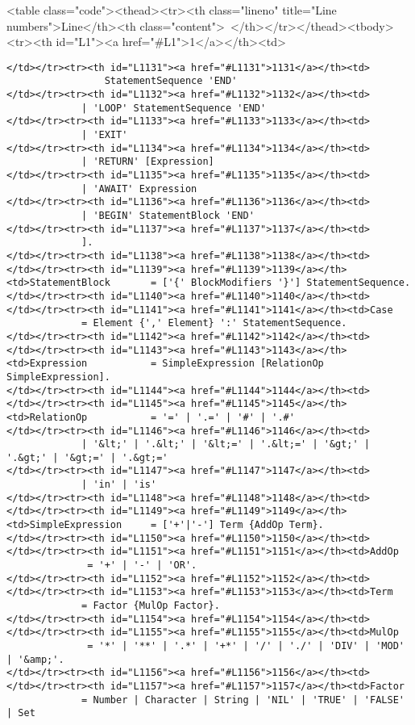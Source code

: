 <table class="code"><thead><tr><th class="lineno" title="Line numbers">Line</th><th class="content"> </th></tr></thead><tbody><tr><th id="L1"><a href="#L1">1</a></th><td>\documentclass[a4paper,11pt]{article}
\begin{document}
\begin{lstlisting}[language = EBNF, frame=none,xleftmargin=0mm]
</td></tr><tr><th id="L1131"><a href="#L1131">1131</a></th><td>                         StatementSequence 'END'
</td></tr><tr><th id="L1132"><a href="#L1132">1132</a></th><td>                     | 'LOOP' StatementSequence 'END'
</td></tr><tr><th id="L1133"><a href="#L1133">1133</a></th><td>                     | 'EXIT'
</td></tr><tr><th id="L1134"><a href="#L1134">1134</a></th><td>                     | 'RETURN' [Expression]
</td></tr><tr><th id="L1135"><a href="#L1135">1135</a></th><td>                     | 'AWAIT' Expression
</td></tr><tr><th id="L1136"><a href="#L1136">1136</a></th><td>                     | 'BEGIN' StatementBlock 'END'
</td></tr><tr><th id="L1137"><a href="#L1137">1137</a></th><td>                     ].
</td></tr><tr><th id="L1138"><a href="#L1138">1138</a></th><td>
</td></tr><tr><th id="L1139"><a href="#L1139">1139</a></th><td>StatementBlock       = ['{' BlockModifiers '}'] StatementSequence.
</td></tr><tr><th id="L1140"><a href="#L1140">1140</a></th><td>
</td></tr><tr><th id="L1141"><a href="#L1141">1141</a></th><td>Case                 = Element {',' Element} ':' StatementSequence.
</td></tr><tr><th id="L1142"><a href="#L1142">1142</a></th><td>
</td></tr><tr><th id="L1143"><a href="#L1143">1143</a></th><td>Expression           = SimpleExpression [RelationOp SimpleExpression].
</td></tr><tr><th id="L1144"><a href="#L1144">1144</a></th><td>
</td></tr><tr><th id="L1145"><a href="#L1145">1145</a></th><td>RelationOp           = '=' | '.=' | '#' | '.#'
</td></tr><tr><th id="L1146"><a href="#L1146">1146</a></th><td>                     | '&lt;' | '.&lt;' | '&lt;=' | '.&lt;=' | '&gt;' | '.&gt;' | '&gt;=' | '.&gt;='
</td></tr><tr><th id="L1147"><a href="#L1147">1147</a></th><td>                     | 'in' | 'is'
</td></tr><tr><th id="L1148"><a href="#L1148">1148</a></th><td>
</td></tr><tr><th id="L1149"><a href="#L1149">1149</a></th><td>SimpleExpression     = ['+'|'-'] Term {AddOp Term}.
</td></tr><tr><th id="L1150"><a href="#L1150">1150</a></th><td>
</td></tr><tr><th id="L1151"><a href="#L1151">1151</a></th><td>AddOp                = '+' | '-' | 'OR'.
</td></tr><tr><th id="L1152"><a href="#L1152">1152</a></th><td>
</td></tr><tr><th id="L1153"><a href="#L1153">1153</a></th><td>Term                 = Factor {MulOp Factor}.
</td></tr><tr><th id="L1154"><a href="#L1154">1154</a></th><td>
</td></tr><tr><th id="L1155"><a href="#L1155">1155</a></th><td>MulOp                = '*' | '**' | '.*' | '+*' | '/' | './' | 'DIV' | 'MOD' | '&amp;'.
</td></tr><tr><th id="L1156"><a href="#L1156">1156</a></th><td>
</td></tr><tr><th id="L1157"><a href="#L1157">1157</a></th><td>Factor               = Number | Character | String | 'NIL' | 'TRUE' | 'FALSE' | Set

\end{lstlisting}
\end{document}

